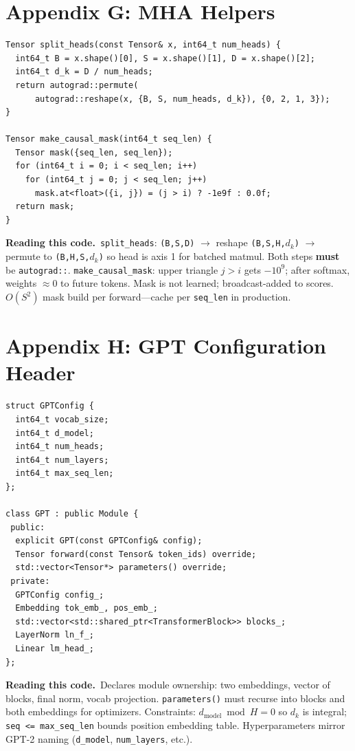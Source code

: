 \documentclass[11pt,a4paper]{article}
\newcommand{\explain}{\par\smallskip\noindent}
\newcommand{\exhead}{\textbf{Reading this code.}\ }
\begin{document}
\section{Appendix G: MHA Helpers}
\label{app:mha}

\begin{lstlisting}[style=cpp]
Tensor split_heads(const Tensor& x, int64_t num_heads) {
  int64_t B = x.shape()[0], S = x.shape()[1], D = x.shape()[2];
  int64_t d_k = D / num_heads;
  return autograd::permute(
      autograd::reshape(x, {B, S, num_heads, d_k}), {0, 2, 1, 3});
}

Tensor make_causal_mask(int64_t seq_len) {
  Tensor mask({seq_len, seq_len});
  for (int64_t i = 0; i < seq_len; i++)
    for (int64_t j = 0; j < seq_len; j++)
      mask.at<float>({i, j}) = (j > i) ? -1e9f : 0.0f;
  return mask;
}
\end{lstlisting}
\explain\exhead \texttt{split\_heads}: \texttt{(B,S,D)} $\rightarrow$ reshape \texttt{(B,S,H,$d_k$)}
$\rightarrow$ permute to \texttt{(B,H,S,$d_k$)} so head is axis 1 for batched matmul. Both steps
\textbf{must} be \texttt{autograd::}. \texttt{make\_causal\_mask}: upper triangle $j>i$ gets
$-10^9$; after softmax, weights $\approx 0$ to future tokens. Mask is not learned; broadcast-added
to scores. $O(S^2)$ mask build per forward---cache per \texttt{seq\_len} in production.

\section{Appendix H: GPT Configuration Header}
\label{app:gpt-config}

\begin{lstlisting}[style=cpp]
struct GPTConfig {
  int64_t vocab_size;
  int64_t d_model;
  int64_t num_heads;
  int64_t num_layers;
  int64_t max_seq_len;
};

class GPT : public Module {
 public:
  explicit GPT(const GPTConfig& config);
  Tensor forward(const Tensor& token_ids) override;
  std::vector<Tensor*> parameters() override;
 private:
  GPTConfig config_;
  Embedding tok_emb_, pos_emb_;
  std::vector<std::shared_ptr<TransformerBlock>> blocks_;
  LayerNorm ln_f_;
  Linear lm_head_;
};
\end{lstlisting}
\explain\exhead Declares module ownership: two embeddings, vector of blocks, final norm, vocab
projection. \texttt{parameters()} must recurse into blocks and both embeddings for optimizers.
Constraints: $d_\text{model} \bmod H = 0$ so $d_k$ is integral; \texttt{seq <= max\_seq\_len}
bounds position embedding table. Hyperparameters mirror GPT-2 naming (\texttt{d\_model},
\texttt{num\_layers}, etc.).
\end{document}
